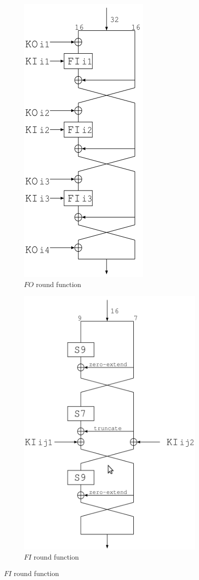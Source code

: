 \begin{figure}[p]
    \begin{subfigure}[b]{0.5\textwidth}
        \centering
        \includegraphics[scale=0.5]{images/misty_fo}
        \caption{$FO$ round function}
        \label{fig:misty_fo}
    \end{subfigure}%
    \begin{subfigure}[b]{0.5\textwidth}
        \centering
        \includegraphics[scale=0.5]{images/misty_fi}
        \caption{$FI$ round function}
        \label{fig:misty_fi}
    \end{subfigure}


\end{figure}
